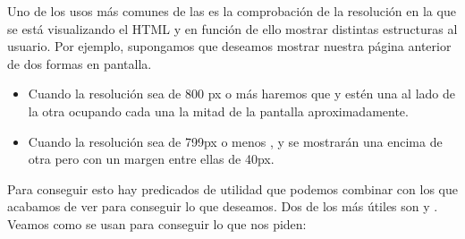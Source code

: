 \documentclass[letterpaper,10pt,spanish]{sphinxmanual}
\begin{document}
Uno de los usos más comunes de las  es la comprobación de la resolución en la que se está visualizando el HTML y en función de ello mostrar distintas estructuras al usuario. Por ejemplo, supongamos que deseamos mostrar nuestra página anterior de dos formas en pantalla.
\begin{itemize}
\item {} 
Cuando la resolución sea de 800 px o más haremos que   y  estén una al lado de la otra ocupando cada una la mitad de la pantalla aproximadamente.

\item {} 
Cuando la resolución sea de 799px o menos ,   y  se mostrarán una encima de otra pero con un margen entre ellas de 40px.

\end{itemize}

Para conseguir esto hay predicados de utilidad que podemos combinar con los que acabamos de ver para conseguir lo que deseamos. Dos de los más útiles son  y . Veamos como se usan para conseguir lo que nos piden:

\begin{sphinxVerbatim}[commandchars=\\\{\}]
   
          
   
          
         
         
\end{sphinxVerbatim}
\end{document}
